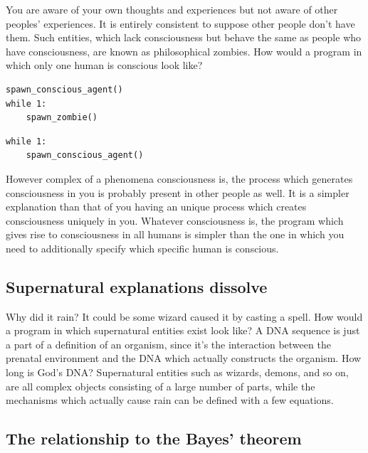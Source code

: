 You are aware of your own thoughts and experiences but not aware of other peoples' experiences.
It is entirely consistent to suppose other people don't have them.
Such entities, which lack consciousness but behave the same as people who have consciousness, are known as philosophical zombies.
How would a program in which only one human is conscious look like?

\begin{lstlisting}[caption={A zombie-filled program.}]
spawn_conscious_agent()
while 1:
	spawn_zombie()
\end{lstlisting}

\begin{lstlisting}[caption={A more probable program.}]
while 1:
	spawn_conscious_agent()
\end{lstlisting}

However complex of a phenomena consciousness is, the process which generates consciousness in you is probably present in other people as well.
It is a simpler explanation than that of you having an unique process which creates consciousness uniquely in you.
Whatever consciousness is, the program which gives rise to consciousness in all humans is simpler than the one in which you need to additionally specify which specific human is conscious.

\newpage

\subsection{Supernatural explanations dissolve}

Why did it rain?
It could be some wizard caused it by casting a spell.
How would a program in which supernatural entities exist look like?
A DNA sequence is just a part of a definition of an organism, since it's the interaction between the prenatal environment and the DNA which actually constructs the organism.
How long is God's DNA?
Supernatural entities such as wizards, demons, and so on, are all complex objects consisting of a large number of parts, while the mechanisms which actually cause rain can be defined with a few equations.

\newpage

\subsection{The relationship to the Bayes' theorem}

